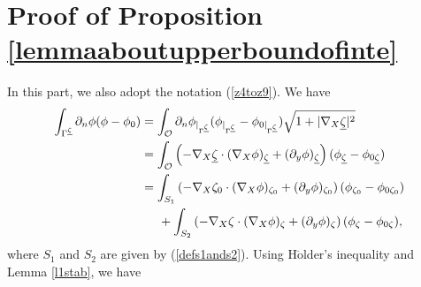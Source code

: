 \documentclass[11pt]{article}
\begin{document}
\section{Proof of Proposition \ref{lemmaaboutupperboundofinte} }\label{A.2}
In this part, we also adopt the notation (\ref{z4toz9}). We have
\begin{equation*}
	\begin{split}
		\displaystyle\int_{\Gamma^{\underline{\zeta}}} \partial_n\phi(\phi-\phi_0)&=\displaystyle\int_{\mathcal O }\partial_n\phi_{|_{\Gamma^{\underline{\zeta}}}}(\phi_{|_{\Gamma^{\underline{\zeta}}}}-\phi_{0|_{\Gamma^{\underline{\zeta}}}})\sqrt{1+|\nabla_X\underline{\zeta}|^2}\\
		&=\displaystyle\int_{\mathcal O }\left(-\nabla_X\underline{\zeta}\cdot(\nabla_X\phi)_{\underline{\zeta}}+(\partial_y\phi)_{\underline{\zeta}}\right)(\phi_{\underline{\zeta}}-\phi_{0\underline{\zeta}})\\
		&=\displaystyle\int_{S_1}\left(-\nabla_X\zeta_0\cdot(\nabla_X\phi)_{\zeta_0}+(\partial_y\phi)_{\zeta_0}\right)(\phi_{\zeta_0}-\phi_{0\zeta_0})\\
		&\hspace{0.5cm}+\displaystyle\int_{S_2}\left(-\nabla_X\zeta\cdot(\nabla_X\phi)_{\zeta}+(\partial_y\phi)_{\zeta}\right)(\phi_{\zeta}-\phi_{0\zeta}),
	\end{split}
\end{equation*}
where $S_1$ and $S_2$ are given by (\ref{defs1ands2}). Using H$\ddot{\text{o}}$lder's inequality and Lemma \ref{l1stab}, we have 
\end{document}
